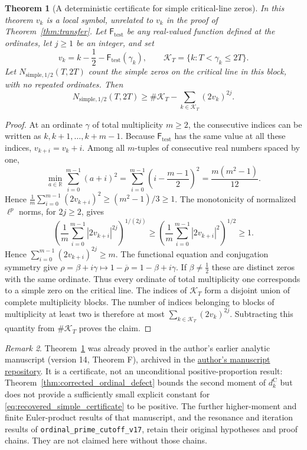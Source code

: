 \documentclass[11pt,a4paper]{article}
\makeatletter
\numberwithin{equation}{section}
\DeclareRobustCommand{\CGref}[1]{\ref{#1}}
\DeclareRobustCommand{\CGeqref}[1]{\eqref{#1}}
\let\CG@origref\ref
\let\CG@origeqref\eqref
\newcommand{\CG@gettip}[1]{\@ifundefined{CGTip@#1}{#1}{\csname CGTip@#1\endcsname}}
\DeclareRobustCommand{\CGref}[1]{\pdftooltip{\CG@origref{#1}}{\CG@gettip{#1}}}
\DeclareRobustCommand{\CGeqref}[1]{\pdftooltip{\CG@origeqref{#1}}{\CG@gettip{#1}}}
\newtheorem{theorem}{Theorem}[section]
\theoremstyle{definition}
\theoremstyle{remark}
\newtheorem{remark}[theorem]{Remark}
\makeatother
\begin{document}
\begin{theorem}[A deterministic certificate for simple critical-line zeros]\label{thm:recovered_simple_certificate}
In this theorem $v_k$ is a local symbol, unrelated to $v_k$ in the proof of Theorem~\CGref{thm:transfer}. Let $\mathsf F_{\mathrm{test}}$ be any real-valued function defined at the ordinates,
let $j\ge1$ be an integer, and set
\[
v_k=k-\frac12-\mathsf F_{\mathrm{test}}(\gamma_k),\qquad
\mathcal K_T=\{k:T<\gamma_k\le2T\}.
\]
Let $N_{\mathrm{simple},1/2}(T,2T)$ count the simple zeros on the
critical line in this block, with no repeated ordinates. Then
\begin{equation}
N_{\mathrm{simple},1/2}(T,2T)
\ge\#\mathcal K_T-\sum_{k\in\mathcal K_T}(2v_k)^{2j}.
\label{eq:recovered_simple_certificate}
\end{equation}
\end{theorem}
\begin{proof}
At an ordinate $\gamma$ of total multiplicity $m\ge2$, the consecutive
indices can be written as $k,k+1,\ldots,k+m-1$. Because $\mathsf F_{\mathrm{test}}$ has the
same value at all these indices, $v_{k+i}=v_k+i$.
Among all $m$-tuples of consecutive real numbers spaced by one,
\[
\min_{a\in\mathbb R}\sum_{i=0}^{m-1}(a+i)^2
=\sum_{i=0}^{m-1}\left(i-\frac{m-1}{2}\right)^2
=\frac{m(m^2-1)}{12}.
\]
Hence
$\frac1m\sum_{i=0}^{m-1}(2v_{k+i})^2\ge(m^2-1)/3\ge1$.
The monotonicity of normalized $\ell^p$ norms, for $2j\ge2$, gives
\[
\left(\frac1m\sum_{i=0}^{m-1}|2v_{k+i}|^{2j}\right)^{1/(2j)}
\ge\left(\frac1m\sum_{i=0}^{m-1}|2v_{k+i}|^2\right)^{1/2}\ge1.
\]
Hence $\sum_{i=0}^{m-1}(2v_{k+i})^{2j}\ge m$.
The functional equation and conjugation symmetry give
$\rho=\beta+i\gamma\mapsto1-\overline\rho=1-\beta+i\gamma$.
If $\beta\ne\frac12$ these are distinct zeros with the same ordinate.
Thus every ordinate of total multiplicity one corresponds to a simple
zero on the critical line.
The indices of $\mathcal K_T$ form a disjoint union of complete
multiplicity blocks. The number of indices belonging to blocks of
multiplicity at least two is therefore at most
$\sum_{k\in\mathcal K_T}(2v_k)^{2j}$.
Subtracting this quantity from $\#\mathcal K_T$ proves the claim.
\end{proof}

\begin{remark}\label{rem:certificate_scope}
Theorem~\CGref{thm:recovered_simple_certificate} was already proved in the author's earlier analytic manuscript (version 14, Theorem F), archived in the \href{https://github.com/vcasana1/Papers-Propios-Consolidados/blob/main/ARTICULOS_SELECCIONADOS/prime_clock_analytic/prime_corrected_clock_v14.tex}{author's manuscript repository}.
It is a certificate, not an unconditional positive-proportion result:
Theorem~\CGref{thm:corrected_ordinal_defect} bounds the second moment
of $d_k^{\mathrm C}$ but does not provide a sufficiently small explicit
constant for \CGeqref{eq:recovered_simple_certificate} to be positive.
The further higher-moment and finite Euler-product results of that
manuscript, and the resonance and iteration results of
\texttt{ordinal\_prime\_cutoff\_v17}, retain their original hypotheses
and proof chains. They are not claimed here without those chains.
\end{remark}
\end{document}
